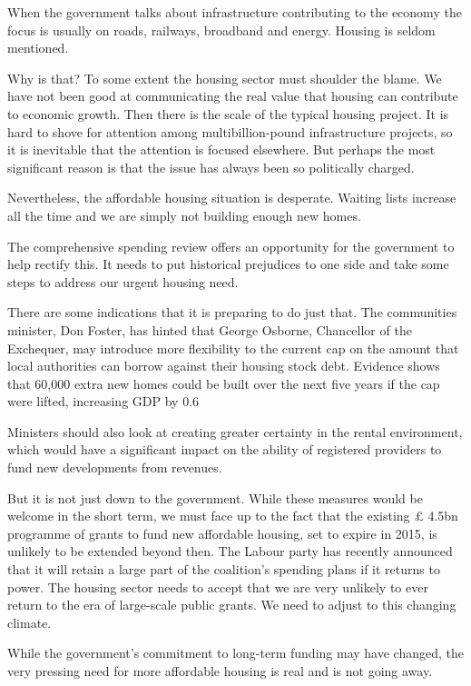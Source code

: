 When the government talks about infrastructure contributing to the economy the focus is usually on roads, railways, broadband and energy. Housing is seldom mentioned.


Why is that? To some extent the housing sector must shoulder the blame. We have not been good at communicating the real value that housing can contribute to economic growth. Then there is the scale of the typical housing project. It is hard to shove for attention among multibillion-pound infrastructure projects, so  it  is inevitable that the attention is focused elsewhere. But perhaps the most significant reason is that the issue has always been so politically charged.


Nevertheless, the affordable housing situation is desperate. Waiting lists increase all the time and we are simply not building enough new homes.


The comprehensive spending review offers an opportunity for the government to help rectify this. It needs to put historical prejudices to one side and take some steps to address our urgent housing need.


There are some indications that it is preparing to do just that. The communities minister, Don Foster, has hinted that George Osborne, Chancellor of the Exchequer, may introduce more flexibility to the current cap on the amount that local authorities can borrow against their housing stock debt. Evidence shows that 60,000 extra new homes could be built over the next five years if the cap were lifted, increasing GDP by 0.6%


Ministers should also look at creating greater certainty in the rental environment, which would have a significant impact on the ability of registered providers to fund new developments from revenues.


But it is not just down to the government. While these measures would be welcome in the short term, we must face up to the fact that the existing £ 4.5bn programme of grants to fund new affordable housing, set to expire in 2015, is unlikely to be extended beyond then. The Labour party has recently announced that it will retain a large part of the coalition's spending plans if it returns to power. The housing sector needs to accept that we are very unlikely to ever return  to the era of large-scale public grants. We need to adjust to this changing climate.


While the government's commitment to long-term funding may have changed, the very pressing need for more affordable housing is real and is not going away.



